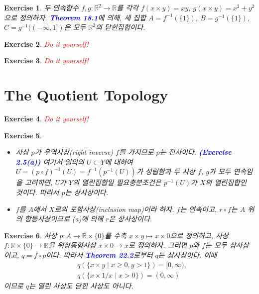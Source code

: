 \documentclass{article}
\newtheorem{exercise}{Exercise}[section]
\newcommand{\R}{\mathbb{R}}
\begin{document}
\begin{exercise}
    두 연속함수 $f,g:\R^2\to\R$를 각각 $f(x\times y)=xy$, $g(x\times y)=x^2+y^2$으로 정의하자. \textcolor{blue}{\textbf{Theorem 18.1}}에 의해, 세 집합 $A=f^{-1}(\{1\})$, $B=g^{-1}(\{1\})$, $C=g^{-1}((-\infty,1])$은 모두 $\R^2$의 닫힌집합이다.
\end{exercise}

\begin{exercise}
    \textcolor{red}{Do it yourself!}
\end{exercise}

\begin{exercise}
    \textcolor{red}{Do it yourself!}
\end{exercise}

\section{The Quotient Topology}

\begin{exercise}
    \textcolor{red}{Do it yourself!}
\end{exercise}

\begin{exercise}
    \phantom{}
    \begin{itemize}
        \item[(a)] 사상 $p$가 우역사상(right inverse) $f$를 가지므로 $p$는 전사이다. \textcolor{blue}{\textbf{(Exercise 2.5(a))}} 여기서 임의의 $U\subset Y$에 대하여 $U=(p\circ f)^{-1}(U)=f^{-1}(p^{-1}(U))$가 성립함과 두 사상 $f$, $g$가 모두 연속임을 고려하면, $U$가 $Y$의 열린집합일 필요충분조건은 $p^{-1}(U)$가 $X$의 열린집합인 것이다. 따라서 $p$는 상사상이다.
        \item[(b)] $f$를 $A$에서 $X$로의 포함사상(inclusion map)이라 하자. $f$는 연속이고, $r\circ f$는 $A$ 위의 항등사상이므로 (a)에 의해 $r$은 상사상이다.
    \end{itemize}
\end{exercise}

\begin{exercise}
    사상 $p:A\to\R\times\{0\}$를 수축 $x\times y\mapsto x\times0$으로 정의하고, 사상 $f:\R\times\{0\}\to\R$을 위상동형사상 $x\times 0\to x$로 정의하자. 그러면 $p$와 $f$는 모두 상사상이고, $q=f\circ p$이다. 따라서 \textcolor{blue}{\textbf{Theorem 22.2}}로부터 $q$는 상사상이다. 이때
    \begin{align*}
        &q(\{x\times y\mid x\geq0,y>1\})=[0,\infty),\\
        &q(\{x\times 1/x\mid x>0\})=(0,\infty)
    \end{align*}
    이므로 $q$는 열린 사상도 닫힌 사상도 아니다.
\end{exercise}
\end{document}
